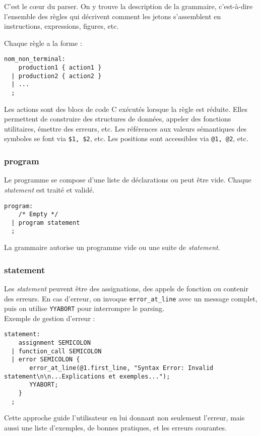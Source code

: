 \documentclass[12pt,a4paper]{article}
\begin{document}
C’est le cœur du parser. On y trouve la description de la grammaire, c’est-à-dire l’ensemble des règles qui décrivent comment les jetons s’assemblent en instructions, expressions, figures, etc.

Chaque règle a la forme :

\begin{verbatim}
nom_non_terminal:
    production1 { action1 }
  | production2 { action2 }
  | ...
  ;
\end{verbatim}

Les actions sont des blocs de code C exécutés lorsque la règle est réduite. Elles permettent de construire des structures de données, appeler des fonctions utilitaires, émettre des erreurs, etc. Les références aux valeurs sémantiques des symboles se font via \texttt{\$1, \$2}, etc. Les positions sont accessibles via \texttt{@1, @2}, etc.

\subsubsection{program}
Le programme se compose d’une liste de déclarations ou peut être vide. Chaque \textit{statement} est traité et validé.

\begin{verbatim}
program:
    /* Empty */
  | program statement
  ;
\end{verbatim}

La grammaire autorise un programme vide ou une suite de \textit{statement}.

\subsubsection{statement}
Les \textit{statement} peuvent être des assignations, des appels de fonction ou contenir des erreurs. En cas d’erreur, on invoque \texttt{error\_at\_line} avec un message complet, puis on utilise \texttt{YYABORT} pour interrompre le parsing. \\

Exemple de gestion d’erreur :
\begin{verbatim}
statement:
    assignment SEMICOLON
  | function_call SEMICOLON
  | error SEMICOLON {
       error_at_line(@1.first_line, "Syntax Error: Invalid statement\n\n...Explications et exemples...");
       YYABORT;
    }
  ;
\end{verbatim}

Cette approche guide l’utilisateur en lui donnant non seulement l’erreur, mais aussi une liste d’exemples, de bonnes pratiques, et les erreurs courantes.
\end{document}
